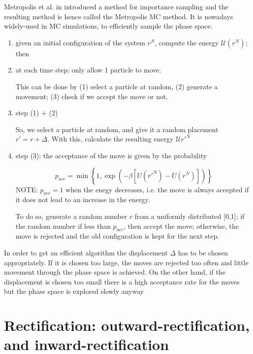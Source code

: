 Metropolis et al. in introduced a method for importance sampling  and the
resulting method is hence called the Metropolis MC method. It is nowadays
widely-used in MC simulations, to efficiently sample the phase space.
\begin{enumerate}
  \item given an initial configuration of the system $r^N$, compute the energy
  $\mathcal{U}(r^N)$; then

   \item at each time step: only allow 1 particle to move.

   This can be done by (1) select a particle at random, (2) generate a movement;
   (3) check if we accept the move or not.

  \item step (1) + (2)

   So, we select a particle at random, and give it a random placement
   $r' = r + \Delta$. With this, calculate the resulting energy
   $\mathcal{U}{r'^N}$

  \item step (3): the acceptance of the move is given by the probability

  \begin{equation}
  p_{acc} = \min\left\{ 1, \exp(-\beta \left[ U(r'^N) - U(r^N) \right])
  \right\}
  \end{equation}
  NOTE: $p_{acc} = 1$ when the enegy decreases, i.e. the move is always accepted if it does not lead to an increase in
the energy.

  To do so, generate a random number $c$ from a uniformly distributed [0,1]; if
  the random number if less than $p_{acc}$, then accept the move; otherwise, the
  move is rejected and the old configuration is kept for the next step.

\end{enumerate}


In order to get an efficient algorithm the displacement $\Delta$ has to be
chosen appropriately. If it is chosen too large, the moves are rejected too
often and little movement through the phase space is achieved.
On the other hand, if the displacement is chosen too small there is
a high acceptance rate for the moves but the phase space is explored slowly
anyway




\section{Rectification: outward-rectification, and inward-rectification}
\label{sec:rectification}


